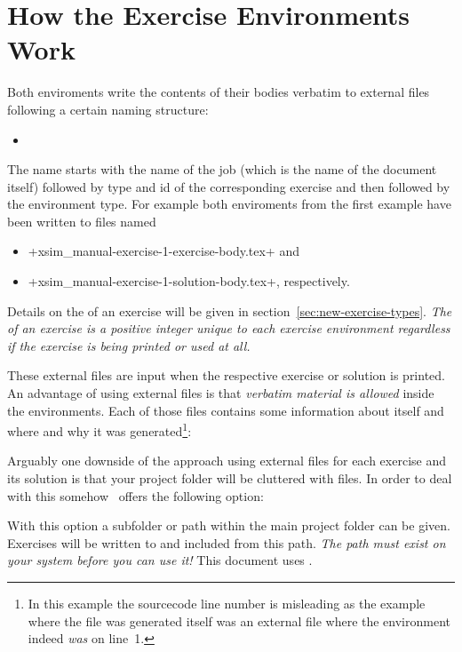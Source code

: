 \documentclass{xsim-manual}
\begin{document}
\section{How the Exercise Environments Work}\label{sec:how-exerc-envir}
Both enviroments write the contents of their bodies verbatim to external files
following a certain naming structure:
\begin{itemize}
  \item
\end{itemize}
The name starts with the name of the job (which is the name of the document
itself) followed by type and id of the corresponding exercise and then
followed by the environment type.  For example both enviroments from the first
example have been written to files named
\begin{itemize}
  \item \verbcode+xsim_manual-exercise-1-exercise-body.tex+ and
  \item \verbcode+xsim_manual-exercise-1-solution-body.tex+, respectively.
\end{itemize}
Details on the  of an exercise will be given in
section~\vref{sec:new-exercise-types}.  \emph{The  of an exercise is
  a positive integer unique to each exercise environment regardless if the
  exercise is being printed or used at all.}

These external files are input when the respective exercise or solution is
printed.  An advantage of using external files is that \emph{verbatim material
  is allowed} inside the environments.  Each of those files contains some
information about itself and where and why it was generated\footnote{In this
  example the sourcecode line number is misleading as the example where the
  file was generated itself was an external file where the 
  environment indeed \emph{was} on line~1.}:


Arguably one downside of the approach using external files for each exercise
and its solution is that your project folder will be cluttered with files.  In
order to deal with this somehow \xsim\ offers the following option:
\begin{options}
  \Default
    With this option a subfolder or path within the main project folder can be
    given.  Exercises will be written to and included from this path.
    \emph{The path must exist on your system before you can use it!} This
    document uses .
\end{options}
\end{document}
